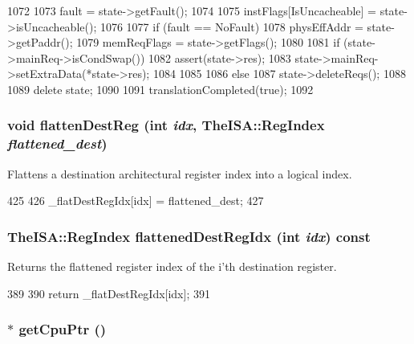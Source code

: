 \begin{DoxyCode}
1072 {
1073     fault = state->getFault();
1074 
1075     instFlags[IsUncacheable] = state->isUncacheable();
1076 
1077     if (fault == NoFault) {
1078         physEffAddr = state->getPaddr();
1079         memReqFlags = state->getFlags();
1080 
1081         if (state->mainReq->isCondSwap()) {
1082             assert(state->res);
1083             state->mainReq->setExtraData(*state->res);
1084         }
1085 
1086     } else {
1087         state->deleteReqs();
1088     }
1089     delete state;
1090 
1091     translationCompleted(true);
1092 }
\end{DoxyCode}
\hypertarget{classBaseDynInst_aa63107f986e5c741f58413c6643298fb}{
\subsubsection[{flattenDestReg}]{\setlength{\rightskip}{0pt plus 5cm}void flattenDestReg (int {\em idx}, \/  TheISA::RegIndex {\em flattened\_\-dest})}}
\label{classBaseDynInst_aa63107f986e5c741f58413c6643298fb}
Flattens a destination architectural register index into a logical index. 


\begin{DoxyCode}
425     {
426         _flatDestRegIdx[idx] = flattened_dest;
427     }
\end{DoxyCode}
\hypertarget{classBaseDynInst_ae669db55c176447543f27f35c1cd3ae5}{
\subsubsection[{flattenedDestRegIdx}]{\setlength{\rightskip}{0pt plus 5cm}TheISA::RegIndex flattenedDestRegIdx (int {\em idx}) const}}
\label{classBaseDynInst_ae669db55c176447543f27f35c1cd3ae5}
Returns the flattened register index of the i'th destination register. 


\begin{DoxyCode}
389     {
390         return _flatDestRegIdx[idx];
391     }
\end{DoxyCode}
\hypertarget{classBaseDynInst_a4f35ce7d5cb2ec57504bc2c2bc03c879}{
\subsubsection[{getCpuPtr}]{$\ast$ getCpuPtr ()}}
\label{classBaseDynInst_a4f35ce7d5cb2ec57504bc2c2bc03c879}



